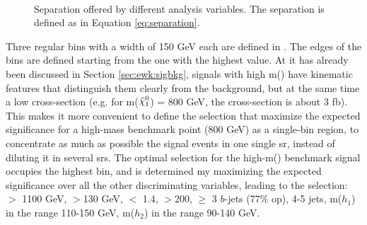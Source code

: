 \begin{figure}[htpb]
\begin{center}
\\
\caption{Separation offered by different analysis variables. The separation is defined as in Equation \ref{eq:separation}.}
\label{fig:ewk:separation}
\end{center}
\end{figure}

Three regular bins with a width of 150 GeV each are defined in \meffb. 
The edges of the bins are defined starting from the one with the highest value. 
At it has already been discussed in Section \ref{sec:ewk:sigbkg},
signals with high m(\hino) have kinematic features that distinguish them clearly from the background, 
but at the same time a low cross-section (e.g. for m($\ninoone$) = 800 GeV, the cross-section is about 3 fb). 
This makes it more convenient to define the selection that maximize the expected significance for a high-mass benchmark point (800 GeV) 
as a single-bin region, to concentrate as much as possible the signal events in one single \gls{sr}, 
instead of diluting it in several \glspl{sr}. %
The optimal selection for the high-m(\hino) benchmark signal occupies the highest \meffb bin,
and is determined my maximizing the expected significance over all the other discriminating variables,
leading to the selection:
\meffb $>$ 1100 GeV, \mtb$>$130 GeV, \dRmax $<$ 1.4, \met $>$200, $\geq$ 3 $b$-jets (77\% \gls{op}), 
4-5 jets, m($h_1$) in the range 110-150 GeV, m($h_2$) in the range 90-140 GeV.

